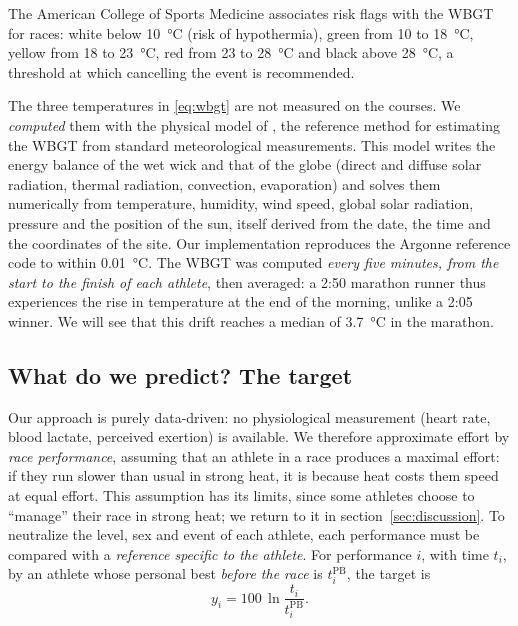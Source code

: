 \documentclass[11pt,a4paper]{article}
\newcommand{\PB}{\mathrm{PB}}
\begin{document}
The American College of Sports Medicine \citep{armstrong2007} associates risk flags with the WBGT for races: white
below 10~°C (risk of hypothermia), green from 10 to 18~°C, yellow from 18 to 23~°C, red from 23 to 28~°C and black
above 28~°C, a threshold at which cancelling the event is recommended.

The three temperatures in \eqref{eq:wbgt} are not measured on the courses. We \emph{computed} them with the physical
model of \citet{liljegren2008}, the reference method for estimating the WBGT from standard meteorological
measurements. This model writes the energy balance of the wet wick and that of the globe (direct and diffuse solar
radiation, thermal radiation, convection, evaporation) and solves them numerically from temperature, humidity, wind
speed, global solar radiation, pressure and the position of the sun, itself derived from the date, the time and the
coordinates of the site. Our implementation reproduces the Argonne reference code to within 0.01~°C. The WBGT was
computed \emph{every five minutes, from the start to the finish of each athlete}, then averaged: a 2:50 marathon
runner thus experiences the rise in temperature at the end of the morning, unlike a 2:05 winner. We will see that
this drift reaches a median of 3.7~°C in the marathon.

\subsection{What do we predict? The target}\label{sec:target}

Our approach is purely data-driven: no physiological measurement (heart rate, blood lactate, perceived exertion) is
available. We therefore approximate effort by \emph{race performance}, assuming that an athlete in a race produces a
maximal effort: if they run slower than usual in strong heat, it is because heat costs them speed at equal effort.
This assumption has its limits, since some athletes choose to ``manage'' their race in strong heat; we return to it in
section~\ref{sec:discussion}. To neutralize the level, sex and event of each athlete, each performance must be
compared with a \emph{reference specific to the athlete}. For performance $i$, with time $t_i$, by an athlete whose
personal best \emph{before the race} is $t_i^{\PB}$, the target is
\begin{equation}\label{eq:target}
y_i = 100\,\ln\frac{t_i}{t_i^{\PB}} .
\end{equation}
\end{document}
